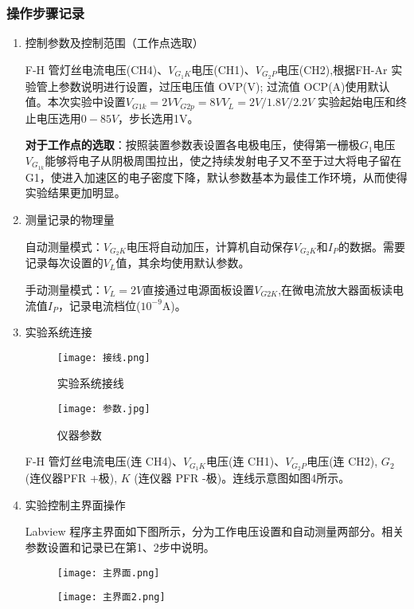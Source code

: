 \documentclass[dvipsnames, svgnames,a4paper,11pt]{article}
\begin{document}
	\subsubsection{操作步骤记录}
	\begin{enumerate}
	
  \item 控制参数及控制范围（工作点选取）

  F-H 管灯丝电流电压(CH4)、$V_{G_1K}$电压(CH1)、$V_{G_2P}$电压(CH2),根据FH-Ar 实验管上参数说明进行设置，过压电压值 OVP(V); 过流值 OCP(A)使用默认值。本次实验中设置$V_{G1k}=2V $\quad $V_{G2p}=8V$\quad $V_{L}=2V/1.8V/2.2V$
  实验起始电压和终止电压选用$0-85V$，步长选用1V。
  
  \textbf{对于工作点的选取}：按照装置参数表设置各电极电压，使得第一栅极$G_1$电压$V_{G_{1k}}$能够将电子从阴极周围拉出，使之持续发射电子又不至于过大将电子留在G1，使进入加速区的电子密度下降，默认参数基本为最佳工作环境，从而使得实验结果更加明显。

  \item 测量记录的物理量
  
  自动测量模式：$V_{G_2K}$电压将自动加压，计算机自动保存$V_{G_2K}$和$I_{P}$的数据。需要记录每次设置的$V_{L}$值，其余均使用默认参数。
  
  手动测量模式：$V_{L}=2V$直接通过电源面板设置$V_{G2K}$,在微电流放大器面板读电流值$I_{P}$，记录电流档位($10^{-9}$A)。

  \item 实验系统连接
  
  \begin{figure}[H]
	\begin{minipage}[b]{0.4\linewidth}
	  \centering
	  \texttt{[image: 接线.png]}
	  \caption{实验系统接线}
	\end{minipage}
	\hfill
	\begin{minipage}[b]{0.4\linewidth}
	  \centering
	  \texttt{[image: 参数.jpg]}
	  \caption{仪器参数}
	\end{minipage}
  \end{figure}

  
  
  F-H 管灯丝电流电压(连 CH4)、$V_{G_1K}$电压(连 CH1)、$V_{G_2P}$电压(连 CH2), $G_2$ (连仪器PFR +极), $K$ (连仪器 PFR -极)。连线示意图如图4所示。
  \item 实验控制主界面操作
  
  Labview 程序主界面如下图所示，分为工作电压设置和自动测量两部分。相关参数设置和记录已在第1、2步中说明。
  \begin{figure}[H]
	\begin{minipage}[b]{0.4\linewidth}
	  \centering
	  \texttt{[image: 主界面.png]}
	 
	\end{minipage}
	\hfill
	\begin{minipage}[b]{0.4\linewidth}
	  \centering
	  \texttt{[image: 主界面2.png]}
	  
	\end{minipage}
  \end{figure}
	\end{enumerate}	
\end{document}
